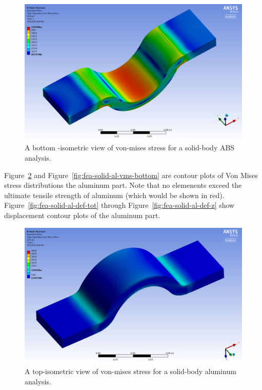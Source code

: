 \begin{figure}[htp]
\centering
\includegraphics[width=1\textwidth]{./figures/fea/fea-solid-vms-bottom}
\caption{A bottom -isometric view of von-mises stress for a solid-body ABS analysis.}
\label{fig:fea-solid-vms-bottom}
\end{figure}

\clearpage


Figure~\ref{fig:fea-solid-al-vms-top} and Figure~\ref{fig:fea-solid-al-vms-bottom} are contour plots of Von Mises stress distributions the aluminum part. Note that no elemenents exceed the ultimate tensile strength of aluminum (which would be shown in red). Figure~\ref{fig:fea-solid-al-def-tot} through Figure~\ref{fig:fea-solid-al-def-z} show displacement contour plots of the aluminum part.\\


\begin{figure}[htp]
\centering
\includegraphics[width=1\textwidth]{./figures/fea/fea-solid-al-vms-top}
\caption{A top-isometric view of von-mises stress for a solid-body aluminum analysis.}
\label{fig:fea-solid-al-vms-top}
\end{figure}

